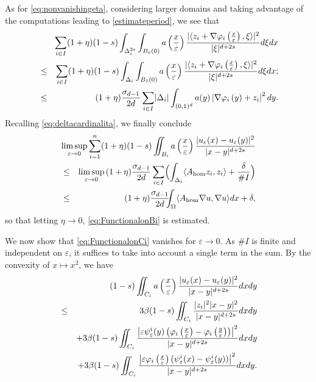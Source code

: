 \documentclass[11pt,a4paper,reqno]{amsart}
\theoremstyle{plain}
\theoremstyle{definition}
\newcommand\e{\varepsilon}
\newcommand\Om{\Omega}
\newcommand\Omid{\Delta_i^{2\varepsilon}}
\theoremstyle{remark}
\begin{document}
As for \eqref{eq:nonvanishingeta}, considering larger domains
and taking advantage of the computations leading to \eqref{estimateperiod}, we see that 
\begin{eqnarray*}
    &&\hspace{-2 cm}\displaystyle \sum_{i\in I}(1+\eta)(1-s)\int_{\Omid}\int_{B_\e(0)} a\left(\frac{x}{\e}\right)\frac{|\langle z_i + \nabla\varphi_i \left(\frac{x}{\e}\right), \xi \rangle|^2}{|\xi|^{d+2s}} d\xi dx\\
    &\leq&  \sum_{i\in I}(1+\eta)(1-s)\int_{\Delta_i}\int_{B_1(0)} a\left(\frac{x}{\e}\right)\frac{|\langle z_i + \nabla\varphi_i \left(\frac{x}{\e}\right), \xi \rangle|^2}{|\xi|^{d+2s}} d\xi dx;\\
    &\leq& (1+\eta)\frac{\sigma_{d-1}}{2d}\sum_{i\in I}\lvert\Delta_i\rvert\int_{(0,1)^d} a(y)\left\lvert\nabla{\varphi_i}\left(y\right)+z_i\right\rvert^2dy.
\end{eqnarray*}
Recalling \eqref{eq:deltacardinalita}, we finally conclude
\begin{eqnarray*}
\nonumber
&&\hspace{-3cm}\limsup_{\e \to 0}\sum_{i=1}^n(1+\eta)(1-s)\iint_{B_i}a\left(\frac{x}{\e}\right)\frac{\lvert u_\e(x)-u_\e(y)\rvert^2}{\lvert x-y\rvert^{d+2s}}\\&\leq&\limsup_{\e \to 0}\,(1+\eta)\frac{\sigma_{d-1}}{2d}\sum_{i\in I}\Bigl(\int_{\Delta_i}\langle A_{\rm hom}z_i,z_i\rangle+\frac{\delta}{\#I}\Bigr)\\
&\leq&(1+\eta)\frac{\sigma_{d-1}}{2d}\hspace{-0.2cm}\int_{\Om} \langle A_{\rm hom}\nabla{u},\nabla{u}\rangle dx+\delta,
\end{eqnarray*}
so that letting $\eta \to 0$,  \eqref{eq:FunctionalonBi} is estimated.


We now show that \eqref{eq:FunctionalonCi} vanishes for $\e \to 0$. As $\#I$ is finite and independent on $\e$, it suffices to take into account a single term in the sum.
By  the convexity of $x\mapsto x^2$, we have 
\begin{eqnarray}\nonumber
&&\hspace{-2 cm} (1-s)\iint_{C_i}a\left(\frac{x}{\e}\right)\frac{\lvert u_\e(x)-u_\e(y)\rvert^2}{\lvert x-y\rvert^{d+2s}}dxdy\\ \label{eq:convex1}
&\leq& 3\beta(1-s)\iint_{C_i}\frac{ \lvert z_i\rvert^2\lvert x-y\rvert^2}{\lvert x-y\rvert^{d+2s}}dxdy \\ 
\label{eq:convex2}
  &&  + 3\beta(1-s)\iint_{C_i}\frac{\left\lvert\e\psi^i_\e(y)\left(\varphi_i\left(\frac{x}{\e}\right)-\varphi_i\left(\frac{y}{\e}\right)\right)\right\rvert^2}{\lvert x-y\rvert^{d+2s}}dxdy\\ \label{eq:convex3}
 && +3\beta(1-s)\iint_{C_i}\frac{\left\lvert\e\varphi_i\left(\frac{x}{\e}\right)(\psi^i_\e(x)-\psi^i_\e(y))\right\rvert^2}{\lvert x-y\rvert^{d+2s}}dxdy.
\end{eqnarray}
\end{document}
